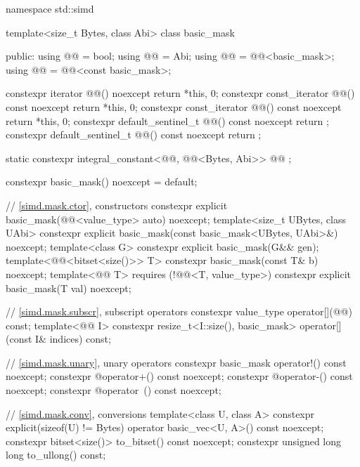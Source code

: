 \begin{codeblock}
namespace std::simd {
  template<size_t Bytes, class Abi> class basic_mask {
  public:
    using @@ = bool;
    using @@ = Abi;
    using @@ = @@<basic_mask>;
    using @@ = @@<const basic_mask>;

    constexpr iterator @@() noexcept { return {*this, 0}; }
    constexpr const_iterator @@() const noexcept { return {*this, 0}; }
    constexpr const_iterator @@() const noexcept { return {*this, 0}; }
    constexpr default_sentinel_t @@() const noexcept { return {}; }
    constexpr default_sentinel_t @@() const noexcept { return {}; }

    static constexpr integral_constant<@@, @@<Bytes, Abi>> @@ {};

    constexpr basic_mask() noexcept = default;

    // \ref{simd.mask.ctor},  constructors
    constexpr explicit basic_mask(@@<value_type> auto) noexcept;
    template<size_t UBytes, class UAbi>
      constexpr explicit basic_mask(const basic_mask<UBytes, UAbi>&) noexcept;
    template<class G>
      constexpr explicit basic_mask(G&& gen);
    template<@@<bitset<size()>> T>
      constexpr basic_mask(const T& b) noexcept;
    template<@@ T>
      requires (!@@<T, value_type>)
      constexpr explicit basic_mask(T val) noexcept;

    // \ref{simd.mask.subscr},  subscript operators
    constexpr value_type operator[](@@) const;
    template<@@ I>
      constexpr resize_t<I::size(), basic_mask> operator[](const I& indices) const;

    // \ref{simd.mask.unary},  unary operators
    constexpr basic_mask operator!() const noexcept;
    constexpr @\seebelow@ operator+() const noexcept;
    constexpr @\seebelow@ operator-() const noexcept;
    constexpr @\seebelow@ operator~() const noexcept;

    // \ref{simd.mask.conv},  conversions
    template<class U, class A>
      constexpr explicit(sizeof(U) != Bytes) operator basic_vec<U, A>() const noexcept;
    constexpr bitset<size()> to_bitset() const noexcept;
    constexpr unsigned long long to_ullong() const;

}}
\end{codeblock}
